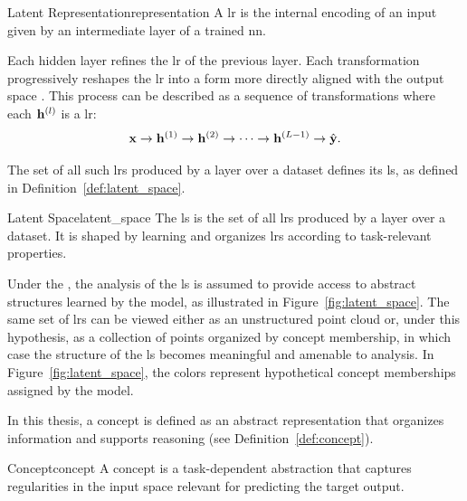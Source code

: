 \begin{definition}{Latent Representation}{representation}
A \gls{lr} is the internal encoding of an input given by an intermediate layer of a trained \gls{nn}.
\end{definition}

Each hidden layer refines the \gls{lr} of the previous layer.
Each transformation progressively reshapes the \gls{lr} into a form more directly aligned with the output space \parencite{rumelhart1986learning}.
This process can be described as a sequence of transformations where each $\latentRepresentation[l]$ is a \gls{lr}:
\[
\vect{x} \rightarrow \latentRepresentation[1] \rightarrow \latentRepresentation[2] \rightarrow \dots \rightarrow \latentRepresentation[L-1] \rightarrow \hat{\vect{y}}.
\]

The set of all such \glspl{lr} produced by a layer over a dataset defines its \gls{ls}, as defined in Definition~\ref{def:latent_space}.

\begin{definition}{Latent Space}{latent_space}
The \gls{ls} is the set of all \glspl{lr} produced by a layer over a dataset.
It is shaped by learning and organizes \glspl{lr} according to task-relevant properties.
\end{definition}

Under the \ConceptHypothesisName, the analysis of the \gls{ls} is assumed to provide access to abstract structures learned by the model, as illustrated in Figure~\ref{fig:latent_space}.
The same set of \glspl{lr} can be viewed either as an unstructured point cloud or, under this hypothesis, as a collection of points organized by concept membership, in which case the structure of the \gls{ls} becomes meaningful and amenable to analysis.
In Figure~\ref{fig:latent_space}, the colors represent hypothetical concept memberships assigned by the model.

In this thesis, a concept is defined as an abstract representation that organizes information and supports reasoning (see Definition~\ref{def:concept}).



\begin{definition}{Concept}{concept}
A concept is a task-dependent abstraction that captures regularities in the input space relevant for predicting the target output.
\end{definition} 

